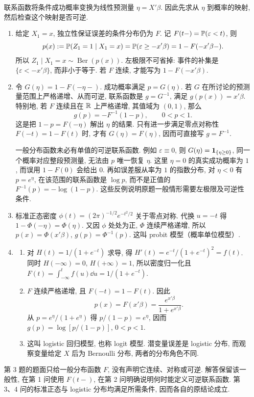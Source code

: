 \begin{solution}
联系函数将条件成功概率变换为线性预测量 $\eta=X'\beta$. 因此先求从 $\eta$ 到概率的映射, 然后检查这个映射是否可逆.
\begin{enumerate}[label=\arabic*.]
\item 给定 $X_1=x$, 独立性保证误差的条件分布仍为 $F$. 记 $F(t-)=\mathbb P(\varepsilon<t)$, 则
\[
p(x):=\mathbb P(Z_1=1\mid X_1=x)
=\mathbb P(\varepsilon\ge-x'\beta)
=1-F(-x'\beta-).
\]
所以 $Z_1\mid X_1=x\sim\operatorname{Ber}(p(x))$. 左极限不可省掉: 事件的补集是 $\{\varepsilon<-x'\beta\}$, 而非小于等于. 若 $F$ 连续, 才能写为 $1-F(-x'\beta)$.
\item 令 $G(\eta)=1-F(-\eta-)$. 成功概率满足 $p=G(\eta)$. 若 $G$ 在所讨论的预测量范围上严格递增、从而可逆, 联系函数是 $g=G^{-1}$, 满足 $g(p(x))=x'\beta$. 特别地, 若 $F$ 连续且在 $\mathbb R$ 上严格递增, 其值域为 $(0,1)$, 那么
\[
g(p)=-F^{-1}(1-p),\qquad 0<p<1.
\]
这是把 $1-p=F(-\eta)$ 解出 $\eta$ 的结果. 只有进一步满足零点对称性 $F(-t)=1-F(t)$ 时, 才有 $G(\eta)=F(\eta)$, 因而可直接写 $g=F^{-1}$.

一般分布函数未必有单值的可逆联系函数. 例如 $\varepsilon\equiv0$, 则 $G(\eta)=\mathbf 1_{\{\eta\ge0\}}$, 同一个概率对应整段预测量, 无法由 $p$ 唯一恢复 $\eta$. 这里 $\eta=0$ 的真实成功概率为 $1$, 而误用 $1-F(0)$ 会给出 $0$. 再如误差服从率为 $1$ 的指数分布, 对 $\eta<0$ 有 $p=e^\eta$, 在该范围的联系函数是 $\log p$, 而不是正值的 $F^{-1}(p)=-\log(1-p)$. 这些反例说明原题一般情形需要左极限及可逆性条件.
\item 标准正态密度 $\phi(t)=(2\pi)^{-1/2}e^{-t^2/2}$ 关于零点对称. 代换 $u=-t$ 得 $1-\Phi(-\eta)=\Phi(\eta)$. 又因 $\phi$ 处处为正, $\Phi$ 连续严格递增, 所以 $p(x)=\Phi(x'\beta)$, $g(p)=\Phi^{-1}(p)$. 这叫 probit 模型（概率单位模型）.
\item
\begin{enumerate}[label=\alph*)]
\item 对 $H(t)=1/(1+e^{-t})$ 求导, 得 $H'(t)=e^{-t}/(1+e^{-t})^2=f(t)$. 同时 $H(-\infty)=0$, $H(+\infty)=1$, 所以密度归一化且 $F(t)=\int_{-\infty}^t f(u)\dd u=1/(1+e^{-t})$.
\item $F$ 连续严格递增, 且 $F(-t)=1-F(t)$. 因此
\[
p(x)=F(x'\beta)=\frac{e^{x'\beta}}{1+e^{x'\beta}}.
\]
从 $p=e^\eta/(1+e^\eta)$ 得 $p/(1-p)=e^\eta$, 因而 $g(p)=\log[p/(1-p)]$, $0<p<1$.
\item 这叫 logistic 回归模型, 也称 logit 模型. 潜变量误差是 logistic 分布, 而观察变量给定 $X$ 后为 Bernoulli 分布, 两者的分布角色不同.
\end{enumerate}
\end{enumerate}
\end{solution}
\begin{remark}
第 3 题的题面只给一般分布函数 $F$, 没有声明它连续、对称或可逆. 解答保留该一般性, 在第 1 问使用 $F(t-)$, 在第 2 问明确说明何时能定义可逆联系函数. 第 3、4 问的标准正态与 logistic 分布均满足所需条件, 因而各自的原结论成立.
\end{remark}
